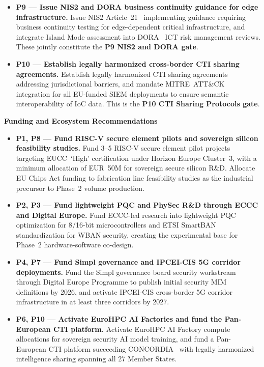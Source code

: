 \documentclass{ieeeaccess}
\begin{document}
\begin{itemize}
    \item \textbf{P9 --- Issue NIS2 and DORA business continuity
    guidance for edge infrastructure.}
    Issue NIS2 Article~21~\cite{nis2} implementing guidance requiring
    business continuity testing for edge-dependent critical
    infrastructure, and integrate Island Mode assessment into
    DORA~\cite{dora} ICT risk management reviews. These jointly
    constitute the \textbf{P9 NIS2 and DORA gate}.

    \item \textbf{P10 --- Establish legally harmonized cross-border CTI
    sharing agreements.}
    Establish legally harmonized CTI sharing agreements addressing
    jurisdictional barriers, and mandate MITRE~ATT\&CK integration for
    all EU-funded SIEM deployments to ensure semantic interoperability
    of IoC data. This is the \textbf{P10 CTI Sharing Protocols gate}.

\end{itemize}

\textbf{Funding and Ecosystem Recommendations}

\begin{itemize}

    \item \textbf{P1, P8 --- Fund RISC-V secure element pilots and
    sovereign silicon feasibility studies.}
    Fund 3--5 RISC-V secure element pilot projects targeting
    EUCC~`High' certification under Horizon Europe Cluster~3, with a
    minimum allocation of EUR~50M for sovereign secure silicon R\&D.
    Allocate EU Chips Act funding to fabrication line feasibility
    studies as the industrial precursor to Phase~2 volume production.

    \item \textbf{P2, P3 --- Fund lightweight PQC and PhySec R\&D
    through ECCC and Digital Europe.}
    Fund ECCC-led research into lightweight PQC optimization for
    8/16-bit microcontrollers and ETSI SmartBAN standardization for
    WBAN security, creating the experimental base for Phase~2
    hardware-software co-design.

    \item \textbf{P4, P7 --- Fund Simpl governance and IPCEI-CIS
    5G corridor deployments.}
    Fund the Simpl governance board security workstream through
    Digital Europe Programme to publish initial security MIM
    definitions by 2026, and activate IPCEI-CIS cross-border 5G
    corridor infrastructure in at least three corridors by 2027.

    \item \textbf{P6, P10 --- Activate EuroHPC AI Factories and fund
    the Pan-European CTI platform.}
    Activate EuroHPC AI Factory compute allocations for sovereign
    security AI model training, and fund a Pan-European CTI platform
    succeeding CONCORDIA~\cite{concordia} with legally harmonized
    intelligence sharing spanning all 27 Member States.

\end{itemize}
\end{document}
